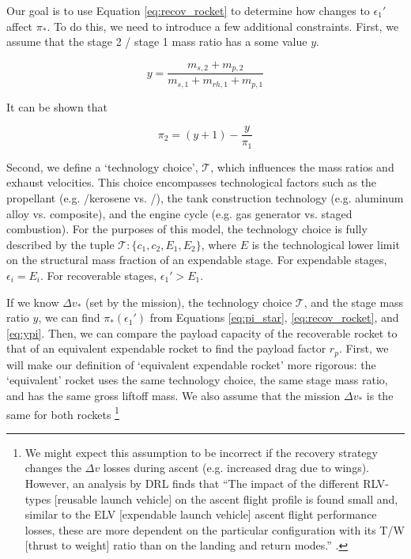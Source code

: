 \documentclass[conf]{new-aiaa}
\begin{document}
Our goal is to use Equation \ref{eq:recov_rocket} to determine how changes to $\epsilon_1'$ affect $\pi_*$. To do this, we need to introduce a few additional constraints. First, we assume that the stage 2 / stage 1 mass ratio has a some value $y$.

\begin{equation}
y = \frac{m_{s,2} + m_{p,2}}{m_{s,1} + m_{rh,1} + m_{p,1}}
\end{equation}

It can be shown that

\begin{equation}
\label{eq:ypi}
\pi_2 = (y + 1) - \frac{y}{\pi_1}
\end{equation}

Second, we define a `technology choice', $\mathcal{T}$, which influences the mass ratios and exhaust velocities. This choice encompasses technological factors such as the propellant (e.g. /kerosene vs. /), the tank construction technology (e.g. aluminum alloy vs. composite), and the engine cycle (e.g. gas generator vs. staged combustion). For the purposes of this model, the technology choice is fully described by the tuple $\mathcal{T} : \{ c_1, c_2, E_1, E_2 \}$, where $E$ is the technological lower limit on the structural mass fraction of an expendable stage. For expendable stages, $\epsilon_i = E_i$. For recoverable stages, $\epsilon_1' > E_1$.

If we know $\Delta v_*$ (set by the mission), the technology choice $\mathcal{T}$, and the stage mass ratio $y$, we can find $\pi_*(\epsilon_1')$ from Equations \ref{eq:pi_star}, \ref{eq:recov_rocket}, and \ref{eq:ypi}. Then, we can compare the payload capacity of the recoverable rocket to that of an equivalent expendable rocket to find the payload factor $r_p$. First, we will make our definition of `equivalent expendable rocket' more rigorous: the `equivalent' rocket uses the same technology choice, the same stage mass ratio, and has the same gross liftoff mass. We also assume that the mission $\Delta v_*$ is the same for both rockets \footnote{We might expect this assumption to be incorrect if the recovery strategy changes the $\Delta v$ losses during ascent (e.g. increased drag due to wings). However, an analysis by DRL finds that ``The impact of the different RLV-types [reusable launch vehicle] on the ascent flight profile is found small and, similar to the ELV [expendable launch vehicle] ascent flight performance losses, these are more dependent on the particular configuration with its T/W [thrust to weight] ratio than on the landing and return modes.'' \cite{Stappert2017}.}
\end{document}

